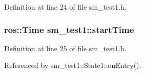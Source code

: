 Definition at line 24 of file sm\+\_\+test1.\+h.

\subsubsection[{\texorpdfstring{start\+Time}{startTime}}]{\setlength{\rightskip}{0pt plus 5cm}ros\+::\+Time sm\+\_\+test1\+::start\+Time}\hypertarget{namespacesm__test1_abb9998c780883187824713b717353f85}{}\label{namespacesm__test1_abb9998c780883187824713b717353f85}


Definition at line 25 of file sm\+\_\+test1.\+h.



Referenced by sm\+\_\+test1\+::\+State1\+::on\+Entry().

